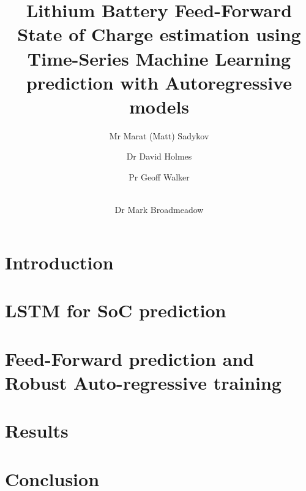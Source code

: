 \documentclass[fleqn,12pt]{olplainarticle}
\title{Lithium Battery Feed-Forward State of Charge estimation using Time-Series Machine Learning prediction with Autoregressive models}
\author[1]{Mr Marat (Matt) Sadykov}
\author[2]{Dr David Holmes}
\author[3]{Pr Geoff Walker}
\author[4]{\\Dr Mark Broadmeadow}
\affil[1]{Queensland University of Technology}
\begin{document}
\flushbottom
\maketitle
\thispagestyle{empty}
\section{Introduction} \label{sec:Introduction}

\section{LSTM for SoC prediction} \label{sec:layer}

\section{Feed-Forward prediction and Robust Auto-regressive training} \label{sec:feed}

\section{Results} \label{sec:results}

\section{Conclusion} \label{sec:conclussion}




\end{document}

